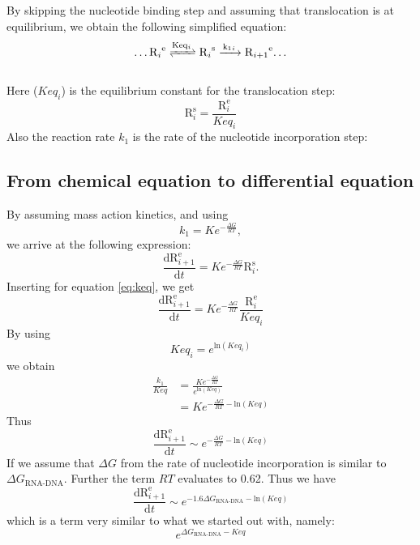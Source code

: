 \documentclass[a4paper]{article}
\newcommand{\te}[1]{\text{#1}}
\newcommand{\diff}[2]{\frac{\mathrm{d} #1}{\mathrm{d} #2}}
\begin{document}
By skipping the nucleotide binding step and assuming that translocation is at
equilibrium, we obtain the following simplified equation:
\\
\begin{align}
\dots\ce{R_i^{\text{e}}
<=>[\ce{Keq_i}]
R_i^{\text{s}}
->[\ce{k1_i}]
R_{i+1}^{\text{e}}\dots
}
\label{eq:reduced3}
\end{align}
\\
Here ($Keq_i$) is the equilibrium constant for the translocation step:
\begin{equation}
	\te{R}_i^{\te{s}} = \frac{\te{R}_i^{\te{e}}}{Keq_i}
	\label{eq:keq}
\end{equation}
Also the reaction rate $k_1$ is the rate of the nucleotide incorporation step:

\subsection{From chemical equation to differential equation}
By assuming mass action kinetics, and using
\begin{equation*}
	k_1 = Ke^{-\frac{\Delta G}{RT}},
\end{equation*}
we arrive at the following expression:
\begin{equation*}
	\diff{\te{R}_{i+1}^{\te{e}}}{t} = Ke^{-\frac{\Delta G}{RT}}\te{R}_{i}^{\te{s}}.
\end{equation*}
Inserting for equation \ref{eq:keq}, we get
\begin{equation*}
	\diff{\te{R}_{i+1}^{\te{e}}}{t} = Ke^{-\frac{\Delta G}{RT}}\frac{\te{R}_i^{\te{e}}}{Keq_i}
\end{equation*}
By using
\begin{equation*}
	Keq_i = e^{\te{ln}(Keq_i)}
\end{equation*}
we obtain
\begin{align*}
	\frac{k_1}{Keq} &= \frac{Ke^{-\frac{\Delta G}{RT}}}{e^{\te{ln}(Keq)}}\\
	                &= Ke^{-\frac{\Delta G}{RT} - \te{ln}(Keq)}
\end{align*}
Thus 
\begin{equation}
	\diff{\te{R}_{i+1}^{\te{e}}}{t} \sim e^{-\frac{\Delta G}{RT} - \te{ln}(Keq)}
	\label{eq:stuff}
\end{equation}
If we assume that $\Delta G$ from the rate of nucleotide incorporation is
similar to $\Delta G_{\text{RNA-DNA}}$. Further the term $RT$ evaluates to
0.62. Thus we have 
\begin{equation*}
	\diff{\te{R}_{i+1}^{\te{e}}}{t} \sim e^{-1.6\Delta G_{\text{RNA-DNA}} - \te{ln}(Keq)}
\end{equation*}
which is a term very similar to what we started out with, namely:
\begin{equation*}
	e^{\Delta G_{\text{RNA-DNA}} - Keq}
\end{equation*}
\end{document}
